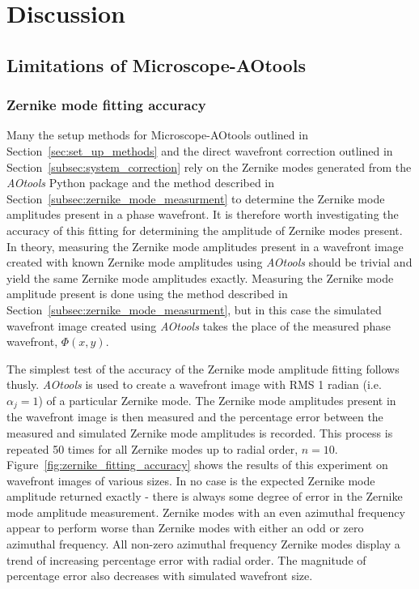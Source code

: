 \chapter{Discussion}

\section{Limitations of Microscope-AOtools}
\label{sec:limitations}

\subsection{Zernike mode fitting accuracy}
\label{subsec:zernike_accuracy}

Many the setup methods for Microscope-AOtools outlined in 
Section~\ref{sec:set_up_methods} and the direct wavefront correction 
outlined in Section~\ref{subsec:system_correction} rely on the Zernike 
modes generated from the \textit{AOtools} Python package and the method 
described in Section~\ref{subsec:zernike_mode_measurment} to determine the 
Zernike mode amplitudes present in a phase 
wavefront\cite{townson2019aotools}. It is therefore worth investigating the 
accuracy of this fitting for determining the amplitude of Zernike modes 
present. In theory, measuring the Zernike mode amplitudes present in a 
wavefront image created with known Zernike mode amplitudes using 
\textit{AOtools} should be trivial and yield the same Zernike mode amplitudes 
exactly. Measuring the Zernike mode amplitude present is done using the 
method described in Section~\ref{subsec:zernike_mode_measurment}, but in this 
case the simulated wavefront image created using \textit{AOtools} takes the 
place of the measured phase wavefront, $\Phi(x,y)$. 

The simplest test of the accuracy of the Zernike mode amplitude fitting 
follows thusly. \textit{AOtools} is used to create a wavefront image with RMS 
1 radian (i.e. $\alpha_{j} = 1$) of a particular Zernike mode. The Zernike 
mode amplitudes present in the wavefront image is then measured and the 
percentage error between the measured and simulated Zernike mode amplitudes 
is recorded. This process is repeated 50 times for all Zernike modes up to 
radial order, $n = 10$. Figure~\ref{fig:zernike_fitting_accuracy} shows the 
results of this experiment on wavefront images of various sizes. In no case 
is the expected Zernike mode amplitude returned exactly - there is always 
some degree of error in the Zernike mode amplitude measurement. Zernike modes 
with an even azimuthal frequency appear to perform worse than Zernike modes 
with either an odd or zero azimuthal frequency. All non-zero azimuthal 
frequency Zernike modes display a trend of increasing percentage error with 
radial order. The magnitude of percentage error also decreases with simulated 
wavefront size. 


